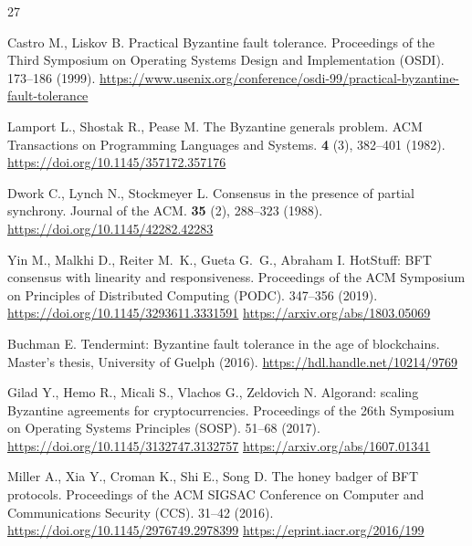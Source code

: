
\begin{thebibliography}{27}

Castro M., Liskov B. Practical Byzantine fault tolerance. Proceedings of the
Third Symposium on Operating Systems Design and Implementation (OSDI). 173--186
(1999).
\url{https://www.usenix.org/conference/osdi-99/practical-byzantine-fault-tolerance}

Lamport L., Shostak R., Pease M. The Byzantine generals problem. ACM
Transactions on Programming Languages and Systems. \textbf{4} (3), 382--401
(1982).
\url{https://doi.org/10.1145/357172.357176}

Dwork C., Lynch N., Stockmeyer L. Consensus in the presence of partial
synchrony. Journal of the ACM. \textbf{35} (2), 288--323 (1988).
\url{https://doi.org/10.1145/42282.42283}

Yin M., Malkhi D., Reiter M.~K., Gueta G.~G., Abraham I. HotStuff: BFT consensus
with linearity and responsiveness. Proceedings of the ACM Symposium on
Principles of Distributed Computing (PODC). 347--356 (2019).
\url{https://doi.org/10.1145/3293611.3331591}
\url{https://arxiv.org/abs/1803.05069}

Buchman E. Tendermint: Byzantine fault tolerance in the age of blockchains.
Master's thesis, University of Guelph (2016).
\url{https://hdl.handle.net/10214/9769}

Gilad Y., Hemo R., Micali S., Vlachos G., Zeldovich N. Algorand: scaling
Byzantine agreements for cryptocurrencies. Proceedings of the 26th Symposium on
Operating Systems Principles (SOSP). 51--68 (2017).
\url{https://doi.org/10.1145/3132747.3132757}
\url{https://arxiv.org/abs/1607.01341}

Miller A., Xia Y., Croman K., Shi E., Song D. The honey badger of BFT protocols.
Proceedings of the ACM SIGSAC Conference on Computer and Communications Security
(CCS). 31--42 (2016).
\url{https://doi.org/10.1145/2976749.2978399}
\url{https://eprint.iacr.org/2016/199}


\end{thebibliography}
